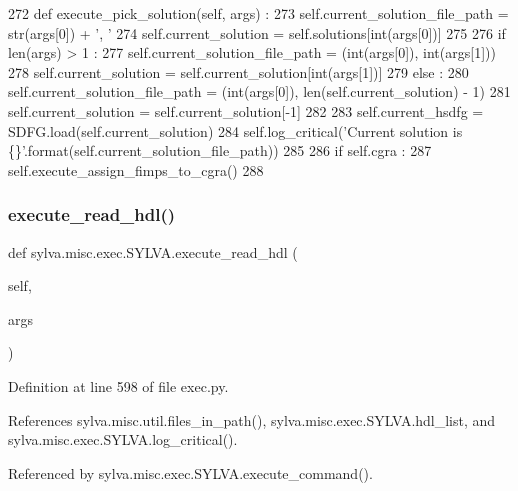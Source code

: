 \begin{DoxyCode}
272   \textcolor{keyword}{def }execute\_pick\_solution(self, args) :
273     self.current\_solution\_file\_path = str(args[0]) + \textcolor{stringliteral}{', '}
274     self.current\_solution = self.solutions[int(args[0])]
275 
276     \textcolor{keywordflow}{if} len(args) > 1 :
277       self.current\_solution\_file\_path = (int(args[0]), int(args[1]))
278       self.current\_solution = self.current\_solution[int(args[1])]
279     \textcolor{keywordflow}{else} :
280       self.current\_solution\_file\_path = (int(args[0]), len(self.current\_solution) - 1)
281       self.current\_solution = self.current\_solution[-1]
282 
283     self.current\_hsdfg = SDFG.load(self.current\_solution)
284     self.log\_critical(\textcolor{stringliteral}{'Current solution is \{\}'}.format(self.current\_solution\_file\_path))
285 
286     \textcolor{keywordflow}{if} self.cgra :
287       self.execute\_assign\_fimps\_to\_cgra()
288 
\end{DoxyCode}
\mbox{\label{classsylva_1_1misc_1_1exec_1_1_s_y_l_v_a_a6b4351626d411764ca605cdc23158f60}} 
\subsubsection{\texorpdfstring{execute\+\_\+read\+\_\+hdl()}{execute\_read\_hdl()}}
{\footnotesize\ttfamily def sylva.\+misc.\+exec.\+S\+Y\+L\+V\+A.\+execute\+\_\+read\+\_\+hdl (\begin{DoxyParamCaption}\item[{}]{self,  }\item[{}]{args }\end{DoxyParamCaption})}



Definition at line 598 of file exec.\+py.



References sylva.\+misc.\+util.\+files\+\_\+in\+\_\+path(), sylva.\+misc.\+exec.\+S\+Y\+L\+V\+A.\+hdl\+\_\+list, and sylva.\+misc.\+exec.\+S\+Y\+L\+V\+A.\+log\+\_\+critical().



Referenced by sylva.\+misc.\+exec.\+S\+Y\+L\+V\+A.\+execute\+\_\+command().


